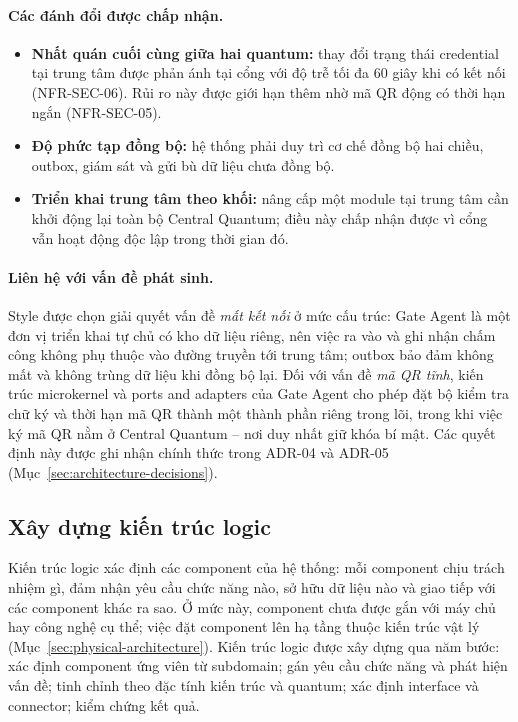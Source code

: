 \paragraph{Các đánh đổi được chấp nhận.}
\begin{itemize}
    \item \textbf{Nhất quán cuối cùng giữa hai quantum:} thay đổi trạng thái credential tại trung tâm được phản ánh tại cổng với độ trễ tối đa 60 giây khi có kết nối (NFR-SEC-06). Rủi ro này được giới hạn thêm nhờ mã QR động có thời hạn ngắn (NFR-SEC-05).
    \item \textbf{Độ phức tạp đồng bộ:} hệ thống phải duy trì cơ chế đồng bộ hai chiều, outbox, giám sát và gửi bù dữ liệu chưa đồng bộ.
    \item \textbf{Triển khai trung tâm theo khối:} nâng cấp một module tại trung tâm cần khởi động lại toàn bộ Central Quantum; điều này chấp nhận được vì cổng vẫn hoạt động độc lập trong thời gian đó.
\end{itemize}

\paragraph{Liên hệ với vấn đề phát sinh.} Style được chọn giải quyết vấn đề \textit{mất kết nối} ở mức cấu trúc: Gate Agent là một đơn vị triển khai tự chủ có kho dữ liệu riêng, nên việc ra vào và ghi nhận chấm công không phụ thuộc vào đường truyền tới trung tâm; outbox bảo đảm không mất và không trùng dữ liệu khi đồng bộ lại. Đối với vấn đề \textit{mã QR tĩnh}, kiến trúc microkernel và ports and adapters của Gate Agent cho phép đặt bộ kiểm tra chữ ký và thời hạn mã QR thành một thành phần riêng trong lõi, trong khi việc ký mã QR nằm ở Central Quantum -- nơi duy nhất giữ khóa bí mật. Các quyết định này được ghi nhận chính thức trong ADR-04 và ADR-05 (Mục~\ref{sec:architecture-decisions}).

\subsection{Xây dựng kiến trúc logic}\label{sec:logical-architecture}
Kiến trúc logic xác định các component của hệ thống: mỗi component chịu trách nhiệm gì, đảm nhận yêu cầu chức năng nào, sở hữu dữ liệu nào và giao tiếp với các component khác ra sao. Ở mức này, component chưa được gắn với máy chủ hay công nghệ cụ thể; việc đặt component lên hạ tầng thuộc kiến trúc vật lý (Mục~\ref{sec:physical-architecture}). Kiến trúc logic được xây dựng qua năm bước: xác định component ứng viên từ subdomain; gán yêu cầu chức năng và phát hiện vấn đề; tinh chỉnh theo đặc tính kiến trúc và quantum; xác định interface và connector; kiểm chứng kết quả.

